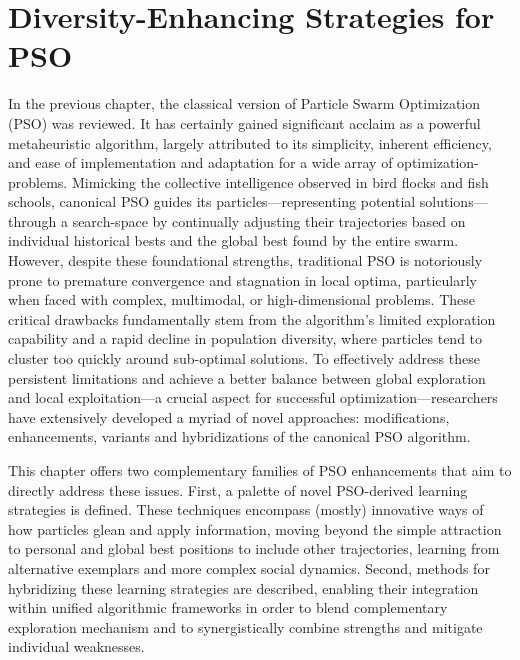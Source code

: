 \chapter[Diversity-Enhancing Strategies]{Diversity-Enhancing Strategies for PSO}
\label{cp:strategies}

{


In the previous chapter, the classical version of Particle Swarm Optimization (PSO) was reviewed.
It has certainly gained significant acclaim as a powerful \gls{metaheuristic} algorithm, largely attributed to its simplicity, inherent efficiency, and ease of implementation and adaptation for a wide array of \glspl{optimization-problem}. Mimicking the collective intelligence observed in bird flocks and fish schools, canonical PSO guides its particles---representing potential solutions---through a \gls{search-space} by continually adjusting their trajectories based on individual historical bests and the global best found by the entire swarm. However, despite these foundational strengths, traditional PSO is notoriously prone to premature convergence and stagnation in local optima, particularly when faced with complex, multimodal, or high-dimensional problems. These critical drawbacks fundamentally stem from the algorithm's limited exploration capability and a rapid decline in population diversity, where particles tend to cluster too quickly around sub-optimal solutions.
To effectively address these persistent limitations and achieve a better balance between global exploration and local exploitation---a crucial aspect for successful optimization---researchers have extensively developed a myriad of novel approaches: modifications, enhancements, variants and hybridizations of the canonical PSO algorithm.

This chapter offers two complementary families of PSO enhancements that aim to directly address these issues.
First, a palette of novel PSO-derived learning strategies is defined. These techniques encompass (mostly) innovative ways of how particles glean and apply information, moving beyond the simple attraction to personal and global best positions to include other trajectories, learning from alternative exemplars and more complex social dynamics.
Second, methods for hybridizing these learning strategies are described, enabling their integration within unified algorithmic frameworks in order to blend complementary exploration mechanism
and to synergistically combine strengths and mitigate individual weaknesses.


}
